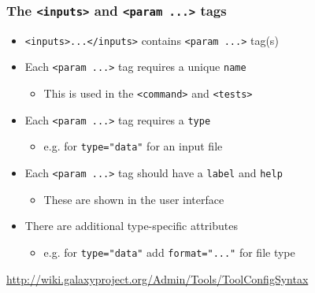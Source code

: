 \documentclass[table]{beamer}
\begin{document}
\begin{frame}
\frametitle{The \texttt{<inputs>} and \texttt{<param ...>} tags}
\begin{itemize}
\item \texttt{<inputs>...</inputs>} contains \texttt{<param ...>} tag(s)
\item Each \texttt{<param ...>} tag requires a unique \texttt{name}
    \begin{itemize}
    \item This is used in the \texttt{<command>} and \texttt{<tests>}
    \end{itemize}
\item Each \texttt{<param ...>} tag requires a \texttt{type}
    \begin{itemize}
    \item e.g. for \texttt{type="data"} for an input file
    \end{itemize}
\item Each \texttt{<param ...>} tag should have a \texttt{label} and \texttt{help}
    \begin{itemize}
    \item These are shown in the user interface
    \end{itemize}
\item There are additional type-specific attributes
    \begin{itemize}
    \item e.g. for \texttt{type="data"} add \texttt{format="..."} for file type
    \end{itemize}
\end{itemize}
{\scriptsize \url{http://wiki.galaxyproject.org/Admin/Tools/ToolConfigSyntax}}
\end{frame}
\end{document}
